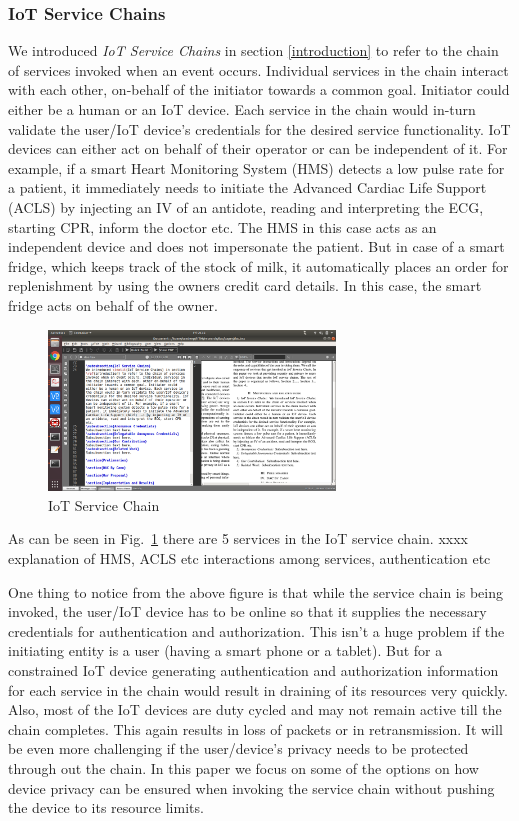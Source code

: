 \documentclass[journal]{IEEEtran}
\begin{document}
\subsubsection{IoT Service Chains} \label{iotsvcch}
We introduced \textit{IoT Service Chains} in section \ref{introduction} to refer to the chain of services invoked when an event occurs. Individual services in the chain interact with each other, on-behalf of the initiator towards a common goal. Initiator could either be a human or an IoT device. Each service in the chain would in-turn validate the user/IoT device's credentials for the desired service functionality. IoT devices can either act on behalf of their operator or can be independent of it. For example, if a smart Heart Monitoring System (HMS) detects a low pulse rate for a patient, it immediately needs to initiate the Advanced Cardiac Life Support (ACLS) by injecting an IV of an antidote, reading and interpreting the ECG, starting CPR, inform the doctor etc. The HMS in this case acts as an independent device and does not impersonate the patient. But in case of a smart fridge, which keeps track of the stock of milk, it automatically places an order for replenishment by using the owners credit card details. In this case, the smart fridge acts on behalf of the owner.

\begin{figure}[htbp]
\centerline{\includegraphics[width=3in]{dac.png}}
\caption{IoT Service Chain}
\label{fig:iotsvc}
\end{figure}

As can be seen in Fig.~\ref{fig:iotsvc} there are 5 services in the IoT service chain. xxxx explanation of HMS, ACLS etc interactions among services, authentication etc

One thing to notice from the above figure is that while the service chain is being invoked, the user/IoT device has to be online so that it supplies the necessary credentials for authentication and authorization.  This isn't a huge problem if the initiating entity is a user (having a smart phone or a tablet). But for a constrained IoT device generating authentication and authorization information for each service in the chain would result in draining of its resources very quickly. Also, most of the IoT devices are duty cycled and may not remain active till the chain completes. This again results in loss of packets or in retransmission. It will be even more challenging if the user/device's privacy needs to be protected through out the chain. In this paper we focus on some of the options on how device privacy can be ensured when invoking the service chain without pushing the device to its resource limits.
\end{document}
